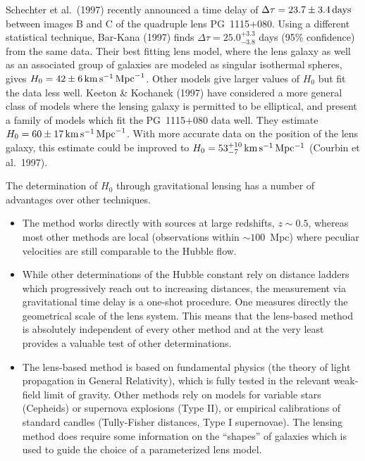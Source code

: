\documentclass[a4paper,10pt]{article} %
\begin{document}
Schechter et al.\ (1997) recently announced a time delay of
$\Delta\tau=23.7\pm3.4\,{\rm days}$ between images B and C of the
quadruple lens PG~1115$+$080. Using a different statistical technique,
Bar-Kana (1997) finds $\Delta\tau=25.0^{+3.3}_{-3.8}$ days (95\%
confidence) from the same data. Their best fitting lens model, where
the lens galaxy as well as an associated group of galaxies are modeled
as singular isothermal spheres, gives $H_0=42\pm6\,{\rm km}\,{\rm
s}^{-1}\,{\rm Mpc}^{-1}$. Other models give larger values of $H_0$ but
fit the data less well. Keeton \& Kochanek (1997) have considered a
more general class of models where the lensing galaxy is permitted to
be elliptical, and present a family of models which fit the
PG~1115$+$080 data well. They estimate $H_0=60\pm17\,{\rm km}\,{\rm
s}^{-1}\,{\rm Mpc}^{-1}$. With more accurate data on the position of
the lens galaxy, this estimate could be improved to
$H_0=53^{+10}_{-7}\,{\rm km\,s^{-1}\,Mpc^{-1}}$ (Courbin et al.\
1997).

The determination of $H_0$ through gravitational lensing has a number
of advantages over other techniques.

\begin{itemize}

\item[1] The method works directly with sources at large redshifts,
$z\sim0.5$, whereas most other methods are local (observations within
$\sim100$~Mpc) where peculiar velocities are still comparable to the
Hubble flow.

\item[2] While other determinations of the Hubble constant rely on
distance ladders which progressively reach out to increasing
distances, the measurement via gravitational time delay is a one-shot
procedure. One measures directly the geometrical scale of the lens
system. This means that the lens-based method is absolutely
independent of every other method and at the very least provides a
valuable test of other determinations.

\item[3] The lens-based method is based on fundamental physics (the
theory of light propagation in General Relativity), which is fully
tested in the relevant weak-field limit of gravity. Other methods rely
on models for variable stars (Cepheids) or supernova explosions (Type
II), or empirical calibrations of standard candles (Tully-Fisher
distances, Type I supernovae). The lensing method does require some
information on the ``shapes'' of galaxies which is used to guide the
choice of a parameterized lens model.

\end{itemize}
\end{document}
